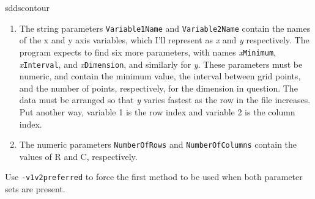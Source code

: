 \begin{sddsprog}{sddscontour}
\begin{itemize}
\begin{enumerate}
\item The string parameters \verb|Variable1Name| and \verb|Variable2Name| contain the names of the
x and y axis variables, which I'll represent as {\em x} and {\em y} respectively.  The program expects to find
six more parameters, with names {\em x}\verb|Minimum|, {\em x}\verb|Interval|, and {\em x}\verb|Dimension|,
and similarly for {\em y}.  These parameters must be numeric, and contain the minimum value, the interval
between grid points, and the number of points, respectively, for the dimension in question.
The data must be arranged so that {\em y} varies fastest as the row in the file increases.  Put another
way, variable 1 is the row index and variable 2 is the column index.
\item The numeric parameters \verb|NumberOfRows| and \verb|NumberOfColumns| contain the values of R and
C, respectively.
\end{enumerate}
Use \verb|-v1v2preferred| to force the first method to be used when both parameter sets are present.


\end{itemize}
\end{sddsprog}
